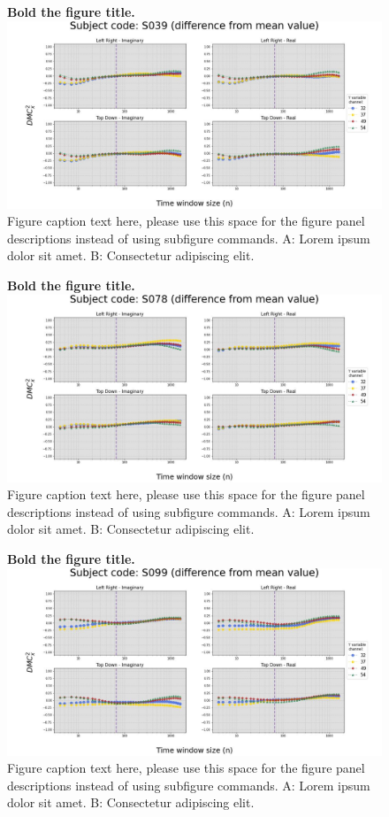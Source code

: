 \documentclass[10pt,letterpaper]{article}
\begin{document}
\begin{figure}[!h]
  \caption{{\bf Bold the figure title.}
  \includegraphics[width=.9\textwidth]{../output/figs/diff/S039.jpg}
  Figure caption text here, please use this space for the figure panel descriptions instead of using subfigure commands. A: Lorem ipsum dolor sit amet. B: Consectetur adipiscing elit.}
  \label{fig:diff_s039}
\end{figure}

\begin{figure}[!h]
  \caption{{\bf Bold the figure title.}
  \includegraphics[width=.9\textwidth]{../output/figs/diff/S078.jpg}
  Figure caption text here, please use this space for the figure panel descriptions instead of using subfigure commands. A: Lorem ipsum dolor sit amet. B: Consectetur adipiscing elit.}
  \label{fig:diff_s078}
\end{figure}


\begin{figure}[!h]
  \caption{{\bf Bold the figure title.}
  \includegraphics[width=.9\textwidth]{../output/figs/diff/S099.jpg}
  Figure caption text here, please use this space for the figure panel descriptions instead of using subfigure commands. A: Lorem ipsum dolor sit amet. B: Consectetur adipiscing elit.}
  \label{fig:diff_s099}
\end{figure}
\end{document}
